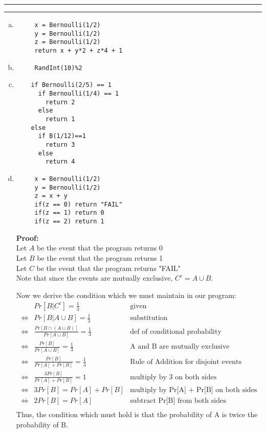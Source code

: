 \documentclass[11pt]{article}
\newcounter{questionCounter}
\newcounter{partCounter}[questionCounter]
\newenvironment{question}[2][\arabic{questionCounter}]{%
    \setcounter{partCounter}{0}%
    \vspace{.25in} \hrule \vspace{0.5em}%
        \noindent{\bf #2}%
    \vspace{0.8em} \hrule \vspace{.10in}%
    \addtocounter{questionCounter}{1}%
}{}
\begin{document}
\begin{question}{Don't Eat the Mushroom}
\begin{enumerate}[a.]
\item \begin{verbatim}
     x = Bernoulli(1/2)
     y = Bernoulli(1/2)
     z = Bernoulli(1/2)
     return x + y*2 + z*4 + 1
\end{verbatim}
\item\begin{verbatim}
     RandInt(10)%2
\end{verbatim}
\item\begin{verbatim}
    if Bernoulli(2/5) == 1 
      if Bernoulli(1/4) == 1
        return 2
      else
        return 1
    else
      if B(1/12)==1
        return 3
      else
        return 4
\end{verbatim}
\item\begin{verbatim}
     x = Bernoulli(1/2)
     y = Bernoulli(1/2)
     z = x + y
     if(z == 0) return "FAIL"
     if(z == 1) return 0
     if(z == 2) return 1
\end{verbatim}
\textbf{Proof:}\\
Let $A$ be the event that the program returns 0\\
Let $B$ be the event that the program returns 1\\
Let $C$ be the event that the program returns "FAIL"\\

Note that since the events are mutually exclusive, $C^c = A \cup B$.

Now we derive the condition which we must maintain in our program:
\begin{align*}
&Pr[B | C^c] = \frac{1}{3}&\text{given}\\
\iff&Pr[B | A \cup B] = \frac{1}{3}&\text{substitution}\\
\iff&\frac{Pr[B \cap (A \cup B)]}{Pr[A \cup B]} = \frac{1}{3}&\text{def of conditional probability}\\
\iff&\frac{Pr[B]}{Pr[A \cup B]} = \frac{1}{3}&\text{A and B are mutually exclusive}\\
\iff&\frac{Pr[B]}{Pr[A] + Pr[B]} = \frac{1}{3}&\text{Rule of Addition for disjoint events}\\
\iff&\frac{3 Pr[B]}{Pr[A] + Pr[B]} = 1&\text{multiply by 3 on both sides}\\
\iff&3 Pr[B] = Pr[A] + Pr[B]&\text{multiply by Pr[A] + Pr[B] on both sides}\\
\iff&2 Pr[B] = Pr[A]&\text{subtract Pr[B] from both sides}\\
\end{align*}
Thus, the condition which must hold is that the probability of A is twice the probability of B.


\end{enumerate}
\end{question}
\end{document}
